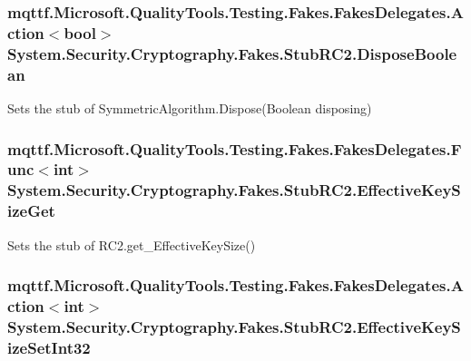 \hypertarget{class_system_1_1_security_1_1_cryptography_1_1_fakes_1_1_stub_r_c2_a9c6052b035e0e0a67e01782af0494034}{
\subsubsection[{Dispose\-Boolean}]{\setlength{\rightskip}{0pt plus 5cm}mqttf.\-Microsoft.\-Quality\-Tools.\-Testing.\-Fakes.\-Fakes\-Delegates.\-Action$<$bool$>$ System.\-Security.\-Cryptography.\-Fakes.\-Stub\-R\-C2.\-Dispose\-Boolean}}\label{class_system_1_1_security_1_1_cryptography_1_1_fakes_1_1_stub_r_c2_a9c6052b035e0e0a67e01782af0494034}


Sets the stub of Symmetric\-Algorithm.\-Dispose(\-Boolean disposing)

\hypertarget{class_system_1_1_security_1_1_cryptography_1_1_fakes_1_1_stub_r_c2_a957e7cacb37805e5b756501e93a35b74}{
\subsubsection[{Effective\-Key\-Size\-Get}]{\setlength{\rightskip}{0pt plus 5cm}mqttf.\-Microsoft.\-Quality\-Tools.\-Testing.\-Fakes.\-Fakes\-Delegates.\-Func$<$int$>$ System.\-Security.\-Cryptography.\-Fakes.\-Stub\-R\-C2.\-Effective\-Key\-Size\-Get}}\label{class_system_1_1_security_1_1_cryptography_1_1_fakes_1_1_stub_r_c2_a957e7cacb37805e5b756501e93a35b74}


Sets the stub of R\-C2.\-get\-\_\-\-Effective\-Key\-Size()

\hypertarget{class_system_1_1_security_1_1_cryptography_1_1_fakes_1_1_stub_r_c2_a678d91abdb7e5efa0b8ae54bf7ced7c7}{
\subsubsection[{Effective\-Key\-Size\-Set\-Int32}]{\setlength{\rightskip}{0pt plus 5cm}mqttf.\-Microsoft.\-Quality\-Tools.\-Testing.\-Fakes.\-Fakes\-Delegates.\-Action$<$int$>$ System.\-Security.\-Cryptography.\-Fakes.\-Stub\-R\-C2.\-Effective\-Key\-Size\-Set\-Int32}}\label{class_system_1_1_security_1_1_cryptography_1_1_fakes_1_1_stub_r_c2_a678d91abdb7e5efa0b8ae54bf7ced7c7}


